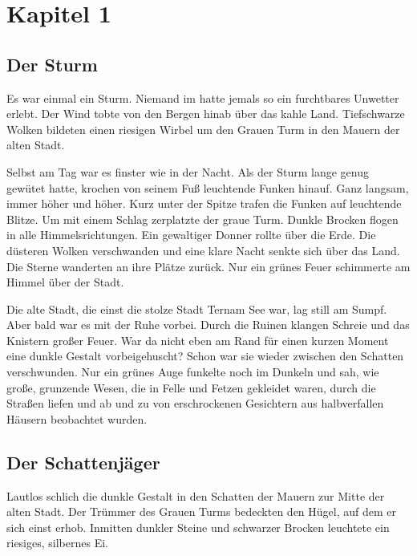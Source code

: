 \documentclass[12pt,a4paper,onecolumn,twoside,ngerman]{book}
\newcommand{\Tern}{Tern}
\begin{document}
  
  

\chapter{Kapitel 1}
\section{Der Sturm}

Es war einmal ein Sturm.
Niemand im \Enland hatte jemals so ein furchtbares Unwetter erlebt. Der Wind tobte von den Bergen hinab über das kahle Land. Tiefschwarze Wolken bildeten einen riesigen Wirbel um den Grauen Turm in den Mauern der alten Stadt. 

Selbst am Tag war es finster wie in der Nacht. Als der Sturm lange genug gewütet hatte, krochen von seinem Fuß leuchtende Funken hinauf. Ganz langsam, immer höher und höher. Kurz unter der Spitze trafen die Funken auf leuchtende Blitze. Um mit einem Schlag zerplatzte der graue Turm. Dunkle Brocken flogen in alle Himmelsrichtungen. Ein gewaltiger Donner rollte über die Erde. Die düsteren Wolken verschwanden und eine klare Nacht senkte sich über das Land. Die Sterne wanderten an ihre Plätze zurück. Nur ein grünes Feuer schimmerte am Himmel über der Stadt.

Die alte Stadt, die einst die stolze Stadt \Tern am See war, lag still am Sumpf. Aber bald war es mit der Ruhe vorbei. Durch die Ruinen klangen Schreie und das Knistern großer Feuer. War da nicht eben am Rand für einen kurzen Moment eine dunkle Gestalt vorbeigehuscht? Schon war sie wieder zwischen den Schatten verschwunden. Nur ein grünes Auge funkelte noch im Dunkeln und sah, wie große, grunzende Wesen, die in Felle und Fetzen gekleidet waren, durch die Straßen liefen und ab und zu von erschrockenen Gesichtern aus halbverfallen Häusern beobachtet wurden.

\section{Der Schattenjäger}
Lautlos schlich die dunkle Gestalt in den Schatten der Mauern zur Mitte der alten Stadt. Der Trümmer des Grauen Turms bedeckten den Hügel, auf dem er sich einst erhob. Inmitten dunkler Steine und schwarzer Brocken leuchtete ein riesiges, silbernes Ei. 
\end{document}
